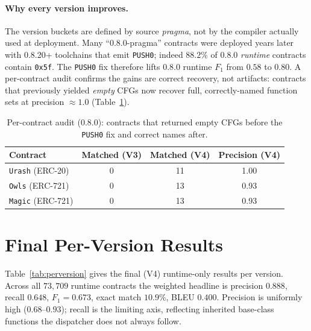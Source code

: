 \documentclass[10pt,conference]{article}
\newcommand{\fbyte}[1]{\texttt{0x#1}}
\begin{document}
\paragraph{Why every version improves.}
The version buckets are defined by source \emph{pragma}, not by the compiler
actually used at deployment. Many ``0.8.0-pragma'' contracts were deployed years
later with 0.8.20+ toolchains that emit \texttt{PUSH0}; indeed $88.2\%$ of 0.8.0
\emph{runtime} contracts contain \fbyte{5f}. The \texttt{PUSH0} fix therefore
lifts 0.8.0 runtime $F_1$ from $0.58$ to $0.80$. A per-contract audit confirms
the gains are correct recovery, not artifacts: contracts that previously yielded
\emph{empty} CFGs now recover full, correctly-named function sets at precision
$\approx 1.0$ (Table~\ref{tab:spotcheck}).

\begin{table}[t]
\centering
\caption{Per-contract audit (0.8.0): contracts that returned empty CFGs before
the \texttt{PUSH0} fix and correct names after.}
\label{tab:spotcheck}
\small
\begin{tabular}{l c c c}
\toprule
Contract & Matched (V3) & Matched (V4) & Precision (V4) \\
\midrule
\texttt{Urash} (ERC-20)  & 0 & 11 & 1.00 \\
\texttt{Owls} (ERC-721)  & 0 & 13 & 0.93 \\
\texttt{Magic} (ERC-721) & 0 & 13 & 0.93 \\
\bottomrule
\end{tabular}
\end{table}

\section{Final Per-Version Results}

Table~\ref{tab:perversion} gives the final (V4) runtime-only results per version.
Across all $73{,}709$ runtime contracts the weighted headline is precision
$0.888$, recall $0.648$, $F_1=0.673$, exact match $10.9\%$, BLEU $0.400$.
Precision is uniformly high ($0.68$--$0.93$); recall is the limiting axis,
reflecting inherited base-class functions the dispatcher does not always follow.
\end{document}
